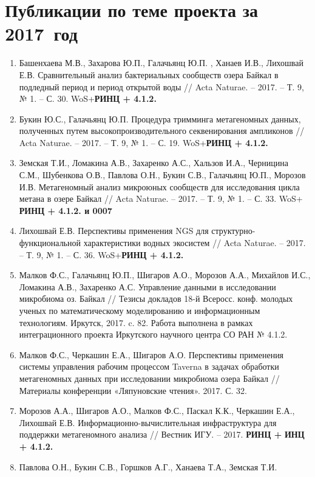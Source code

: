 \documentclass[a4paper,12pt,openany,final]{extreport}
\newcommand\theyear{2017}
\begin{document}
\endgroup

\chapter{Публикации по теме проекта за \theyear{}~год}
\label{chap:publ}
\begin{enumerate}
\item
  Башенхаева М.В., Захарова Ю.П., Галачьянц Ю.П. , Ханаев И.В., Лихошвай
  Е.В. Сравнительный анализ бактериальных сообществ озера Байкал в
  подледный период и период открытой воды // Acta Naturae. -- 2017. --
  Т. 9, № 1. -- С. 30. WoS+\textbf{РИНЦ + 4.1.2.}
\item
  Букин Ю.С., Галачьянц Ю.П. Процедура тримминга метагеномных данных,
  полученных путем высокопроизводительного секвенирования ампликонов //
  Acta Naturae. -- 2017. -- Т. 9, № 1. -- С. 19. WoS+\textbf{РИНЦ +
  4.1.2.}
\item
  Земская Т.И., Ломакина А.В., Захаренко А.С., Хальзов И.А., Черницина
  С.М., Шубенкова О.В., Павлова О.Н., Букин С.В., Галачьянц Ю.П.,
  Морозов И.В. Метагеномный анализ микроюных сообществ для исследования
  цикла метана в озере Байкал // Acta Naturae. -- 2017. -- Т. 9, № 1. --
  С. 33. WoS+ \textbf{РИНЦ + 4.1.2. и 0007}
\item
  Лихошвай Е.В. Перспективы применения NGS для структурно-функциональной
  характеристики водных экосистем // Acta Naturae. -- 2017. -- Т. 9, №
  1. -- С. 36. WoS+\textbf{РИНЦ + 4.1.2.}
\item
  Малков Ф.С., Галачьянц Ю.П., Шигаров А.О., Морозов А.А., Михайлов
  И.С., Ломакина А.В., Захаренко А.С. Управление данными в исследовании
  микробиома оз. Байкал // Тезисы докладов 18-й Всеросс. конф. молодых
  ученых по математическому моделированию и информационным технологиям.
  Иркутск, 2017. c. 82. Работа выполнена в рамках интеграционного
  проекта Иркутского научного центра СО РАН № 4.1.2.
\item
  Малков Ф.С., Черкашин Е.А., Шигаров А.О. Перспективы применения
  системы управления рабочим процессом Taverna в задачах обработки
  метагеномных данных при исследовании микробиома озера Байкал //
  Материалы конференции «Ляпуновские чтения». 2017. С. 32.
\item
  Морозов А.А., Шигаров А.О., Малков Ф.С., Паскал К.К., Черкашин Е.А.,
  Лихошвай Е.В. Информационно-вычислительная инфраструктура для
  поддержки метагеномного анализа // Вестник ИГУ. -- 2017. \textbf{РИНЦ
  +} \textbf{ИНЦ + 4.1.2.}
\item
  Павлова О.Н., Букин С.В., Горшков А.Г., Ханаева Т.А., Земская Т.И.

\end{enumerate}
\end{document}
